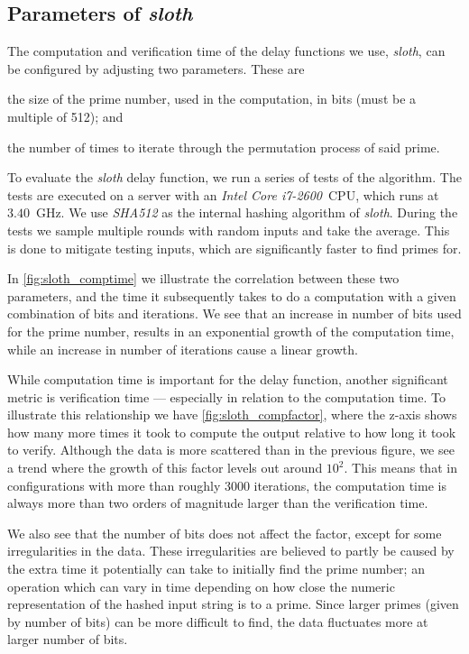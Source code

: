 \subsection{Parameters of \textit{sloth}}%
\label{sub:sloth_parameters}

The computation and verification time of the delay functions we use, \textit{sloth}, can be configured by adjusting two parameters.
These are
\begin{eletterate*}
\item the size of the prime number, used in the computation, in bits (must be a multiple of 512); and
\item the number of times to iterate through the permutation process of said prime.
\end{eletterate*}

To evaluate the \textit{sloth} delay function, we run a series of tests of the algorithm.
The tests are executed on a server with an \textit{Intel Core i7-2600}~CPU, which runs at $3.40$~GHz.
We use \textit{SHA512} as the internal hashing algorithm of \textit{sloth}.
During the tests we sample multiple rounds with random inputs and take the average.
This is done to mitigate testing inputs, which are significantly faster to find primes for.

In \vref{fig:sloth_comptime} we illustrate the correlation between these two parameters, and the time it subsequently takes to do a computation with a given combination of bits and iterations.
We see that an increase in number of bits used for the prime number, results in an exponential growth of the computation time, while an increase in number of iterations cause a linear growth.

While computation time is important for the delay function, another significant metric is verification time --- especially in relation to the computation time.
To illustrate this relationship we have \vref{fig:sloth_compfactor}, where the z-axis shows how many more times it took to compute the output relative to how long it took to verify.
Although the data is more scattered than in the previous figure, we see a trend where the growth of this factor levels out around $10^2$.
This means that in configurations with more than roughly 3000 iterations, the computation time is always more than two orders of magnitude larger than the verification time.

We also see that the number of bits does not affect the factor, except for some irregularities in the data.
These irregularities are believed to partly be caused by the extra time it potentially can take to initially find the prime number; an operation which can vary in time depending on how close the numeric representation of the hashed input string is to a prime.
Since larger primes (given by number of bits) can be more difficult to find, the data fluctuates more at larger number of bits.



